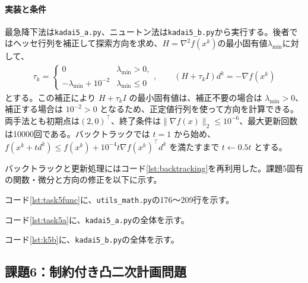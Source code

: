 \documentclass[a4j]{jarticle}
\begin{document}
\paragraph{実装と条件}
最急降下法は\texttt{kadai5\_a.py}、ニュートン法は\texttt{kadai5\_b.py}から実行する。後者ではヘッセ行列を補正して探索方向を求め、$H=\nabla^2f(x^k)$の最小固有値$\lambda_{\min}$に対して、
\begin{align}
  \tau_k=\begin{cases}0&\lambda_{\min}>0,\\-\lambda_{\min}+10^{-2}&\lambda_{\min}\le0\end{cases},\qquad
  (H+\tau_k I)d^k=-\nabla f(x^k)
  \label{eq:modified-newton}
\end{align}
とする。この補正により $H+\tau_k I$ の最小固有値は、補正不要の場合は $\lambda_{\min}>0$、補正する場合は $10^{-2}>0$ となるため、正定値行列を使って方向を計算できる。両手法とも初期点は$(2,0)^\top$、終了条件は$\|\nabla f(x)\|_2\le10^{-6}$、最大更新回数は10000回である。バックトラックでは $t=1$ から始め、$f(x^k+td^k)\le f(x^k)+10^{-4}t\nabla f(x^k)^\top d^k$ を満たすまで $t\leftarrow0.5t$ とする。

バックトラックと更新処理にはコード\ref{lst:backtracking}を再利用した。課題5固有の関数・微分と方向の修正を以下に示す。
\par\noindent
コード\ref{lst:task5func}に、\texttt{utils\_math.py}の176〜209行を示す。
\par



\par\noindent
コード\ref{lst:task5a}に、\texttt{kadai5\_a.py}の全体を示す。
\par




\par\noindent
コード\ref{lst:k5b}に、\texttt{kadai5\_b.py}の全体を示す。
\par




\subsection{課題6：制約付き凸二次計画問題}
\end{document}
